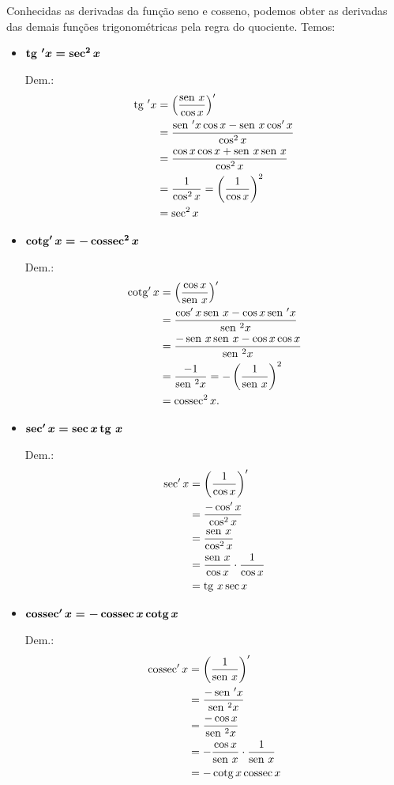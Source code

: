 \cleardoublepage\documentclass[../main.tex]{subfiles}
\begin{document}
Conhecidas as derivadas da função seno e cosseno, podemos obter as derivadas das demais funções trigonométricas pela regra do quociente. Temos:
\begin{itemize}
\item $\boldsymbol{\operatorname{tg}\,' x = \sec^2 x}$

  Dem.:
  \begin{align*}
    \operatorname{tg}\, ' x &= \left(\frac{\operatorname{sen}\, x}{\cos x}\right)'\\
            &= \frac{\operatorname{sen}\,' x\cos x - \operatorname{sen}\, x\cos' x}{\cos^2 x} \\
            &= \frac{\cos x\cos x + \operatorname{sen}\, x\operatorname{sen}\, x}{\cos^2 x} \\
            &= \frac{1}{\cos^2 x} = \left(\frac{1}{\cos x}\right)^2 \\
            &= \sec^2 x
  \end{align*}

\item $\boldsymbol{\operatorname{cotg}' x = -\operatorname{cossec}^2 x}$

  Dem.:
  \begin{align*}
    \operatorname{cotg} ' x &= \left(\frac{\cos x}{\operatorname{sen}\, x}\right)'\\
            &= \frac{\cos' x\operatorname{sen}\, x - \cos x\operatorname{sen}\,' x}{\operatorname{sen}\,^2 x} \\
            &= \frac{-\operatorname{sen}\, x\operatorname{sen}\, x - \cos x\cos x}{\operatorname{sen}\,^2 x} \\
            &= \frac{-1}{\operatorname{sen}\,^2 x} = -\left(\frac{1}{\operatorname{sen}\, x}\right)^2 \\
            &= \operatorname{cossec}^2 x.
  \end{align*}

\item $\boldsymbol{\sec' x = \sec x\operatorname{tg}\, x}$

  Dem.:
  \begin{align*}
    \sec ' x &= \left(\frac{1}{\cos x}\right)'\\
            &= \frac{-\cos' x}{\cos^2 x} \\
            &= \frac{\operatorname{sen}\, x}{\cos^2 x} \\
            &= \frac{\operatorname{sen}\, x}{\cos x}\cdot \frac{1}{\cos x} \\
            &= \operatorname{tg}\, x\sec x
  \end{align*}

\item $\boldsymbol{\operatorname{cossec}' x = -\operatorname{cossec} x\operatorname{cotg} x}$

  Dem.:
  \begin{align*}
    \operatorname{cossec} ' x &= \left(\frac{1}{\operatorname{sen}\, x}\right)'\\
            &= \frac{-\operatorname{sen}\,' x}{\operatorname{sen}\,^2 x} \\
            &= \frac{-\cos x}{\operatorname{sen}\,^2 x} \\
            &= -\frac{\cos x}{\operatorname{sen}\, x}\cdot \frac{1}{\operatorname{sen}\, x} \\
            &= -\operatorname{cotg} x\operatorname{cossec} x
  \end{align*}
\end{itemize}
\end{document}
